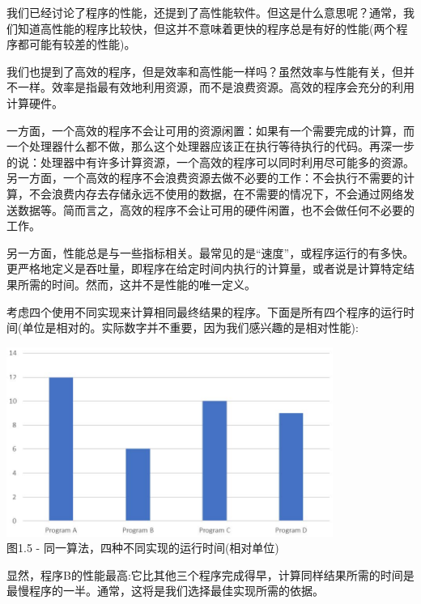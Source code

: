 我们已经讨论了程序的性能，还提到了高性能软件。但这是什么意思呢？通常，我们知道高性能的程序比较快，但这并不意味着更快的程序总是有好的性能(两个程序都可能有较差的性能)。

我们也提到了高效的程序，但是效率和高性能一样吗？虽然效率与性能有关，但并不一样。效率是指最有效地利用资源，而不是浪费资源。高效的程序会充分的利用计算硬件。

一方面，一个高效的程序不会让可用的资源闲置：如果有一个需要完成的计算，而一个处理器什么都不做，那么这个处理器应该正在执行等待执行的代码。再深一步的说：处理器中有许多计算资源，一个高效的程序可以同时利用尽可能多的资源。另一方面，一个高效的程序不会浪费资源去做不必要的工作：不会执行不需要的计算，不会浪费内存去存储永远不使用的数据，在不需要的情况下，不会通过网络发送数据等。简而言之，高效的程序不会让可用的硬件闲置，也不会做任何不必要的工作。

另一方面，性能总是与一些指标相关。最常见的是“速度”，或程序运行的有多快。更严格地定义是吞吐量，即程序在给定时间内执行的计算量，或者说是计算特定结果所需的时间。然而，这并不是性能的唯一定义。


考虑四个使用不同实现来计算相同最终结果的程序。下面是所有四个程序的运行时间(单位是相对的。实际数字并不重要，因为我们感兴趣的是相对性能):

\begin{center}
\includegraphics[width=0.8\textwidth]{content/1/chapter1/images/5.jpg}\\
图1.5 - 同一算法，四种不同实现的运行时间(相对单位)
\end{center}

显然，程序B的性能最高:它比其他三个程序完成得早，计算同样结果所需的时间是最慢程序的一半。通常，这将是我们选择最佳实现所需的依据。

